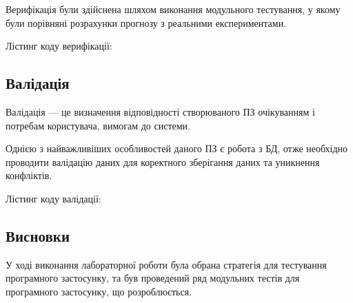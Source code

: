 Верифікація були здійснена шляхом виконання модульного тестування, у якому були порівняні розрахунки прогнозу з реальними експериментами.

Лістинг коду верифікації:


\subsection{Валідація}
Валідація --- це визначення відповідності створюваного ПЗ очікуванням і потребам користувача, вимогам до системи.

Однією з найважливіших особливостей даного ПЗ є робота з БД, отже необхідно проводити валідацію даних для коректного зберігання даних та уникнення конфліктів.

Лістинг коду валідації:


\subsection*{Висновки}
У ході виконання лабораторної роботи була обрана стратегія для тестування програмного застосунку, та був проведений ряд модульних тестів для програмного застосунку, що розроблюється. 


